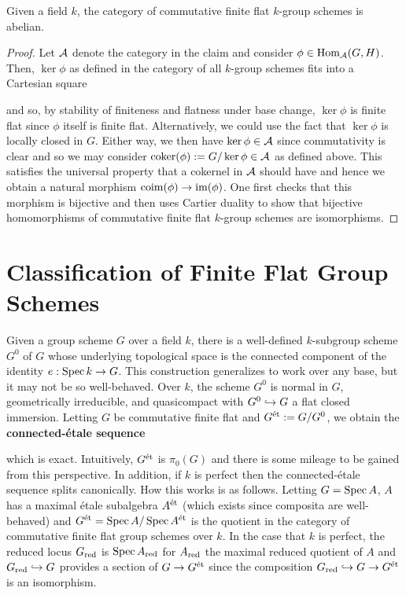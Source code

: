\documentclass[11pt]{article}
\begin{document}
\begin{corollary}
Given a field $k$, the category of commutative finite flat $k$-group schemes is abelian.
\end{corollary}

\begin{proof}
Let $\mathcal{A}$ denote the category in the claim and consider $\phi\in\operatorname{Hom}_{\mathcal{A}}(G,H)$. Then, $\ker\phi$ as defined in the category of all $k$-group schemes fits into a Cartesian square
\begin{center}
\end{center}
and so, by stability of finiteness and flatness under base change, $\ker\phi$ is finite flat since $\phi$ itself is finite flat. Alternatively, we could use the fact that $\ker\phi$ is locally closed in $G$. Either way, we then have $\ker\phi\in\mathcal{A}$ since commutativity is clear and so we may consider $\operatorname{coker}(\phi):=G/\ker\phi\in\mathcal{A}$ as defined above. This satisfies the universal property that a cokernel in $\mathcal{A}$ should have and hence we obtain a natural morphism $\operatorname{coim}(\phi)\to\operatorname{im}(\phi)$. One first checks that this morphism is bijective and then uses Cartier duality to show that bijective homomorphisms of commutative finite flat $k$-group schemes are isomorphisms.
\end{proof}

\section{Classification of Finite Flat Group Schemes}
Given a group scheme $G$ over a field $k$, there is a well-defined $k$-subgroup scheme $G^0$ of $G$ whose underlying topological space is the connected component of the identity $e: \operatorname{Spec} k\to G$. This construction generalizes to work over any base, but it may not be so well-behaved. Over $k$, the scheme $G^0$ is normal in $G$, geometrically irreducible, and quasicompact with $G^0\hookrightarrow G$ a flat closed immersion. Letting $G$ be commutative finite flat and $G^{\operatorname{\acute{e}t}}:=G/G^0$, we obtain the \textbf{connected-\'{e}tale sequence}
\begin{center}
\end{center}
which is exact. Intuitively, $G^{\operatorname{\acute{e}t}}$ is $\pi_0(G)$ and there is some mileage to be gained from this perspective. In addition, if $k$ is perfect then the connected-\'{e}tale sequence splits canonically. How this works is as follows. Letting $G=\operatorname{Spec} A$, $A$ has a maximal \'{e}tale subalgebra $A^{\operatorname{\acute{e}t}}$ (which exists since composita are well-behaved) and $G^{\operatorname{\acute{e}t}}=\operatorname{Spec} A/\operatorname{Spec} A^{\operatorname{\acute{e}t}}$ is the quotient in the category of commutative finite flat group schemes over $k$. In the case that $k$ is perfect, the reduced locus $G_{\operatorname{red}}$ is $\operatorname{Spec} A_{\operatorname{red}}$ for $A_{\operatorname{red}}$ the maximal reduced quotient of $A$ and $G_{\operatorname{red}}\hookrightarrow G$ provides a section of $G\to G^{\operatorname{\acute{e}t}}$ since the composition $G_{\operatorname{red}}\hookrightarrow G\to G^{\operatorname{\acute{e}t}}$ is an isomorphism. 
\end{document}
